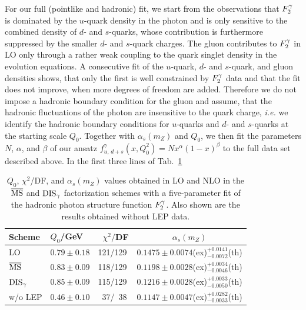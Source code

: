 \documentclass[aps,prl,twocolumn,groupedaddress]{revtex4}
\begin{document}
For our full (pointlike and hadronic) fit, we start from the observations that
$\f2y$ is dominated by the $u$-quark density in the photon and is only
sensitive to the combined density of $d$- and $s$-quarks, whose contribution is
furthermore suppressed by the smaller $d$- and $s$-quark charges. %
The gluon contributes to $\f2y$ in LO only through a rather weak coupling to
the quark singlet density in the evolution equations. A consecutive
fit of the $u$-quark, $d$- and $s$-quark, and gluon densities shows, that only
the first is well constrained by $\f2y$ data and that the fit does not
improve, when more degrees of freedom are added. Therefore we do not impose a
hadronic boundary condition for the gluon and assume, that the hadronic
fluctuations of the photon are insensitive to the quark charge, {\it i.e.} we
identify the hadronic boundary conditions for $u$-quarks and $d$- and
$s$-quarks at the starting scale $Q_0$. Together with $\alpha_s(m_Z)$ and
$Q_0$, we then fit the parameters $N$, $\alpha$, and $\beta$ of our ansatz
$f_{u,\,d+s}^\gamma (x,Q_0^2)=Nx^\alpha(1-x)^\beta$ to the
full data set described above. In the first three lines of Tab.\ \ref{tab:2}
%
\begin{table}
\caption{\label{tab:2}$Q_0$, $\chi^2$/DF,
         and $\alpha_s(m_Z)$ values obtained in LO and
         NLO in the $\overline{\rm MS}$ and ${\rm DIS}_\gamma$ factorization schemes with a
         five-parameter fit of
         the hadronic  photon structure function $\f2y$. Also shown are the 
         results obtained without LEP data.}
\begin{ruledtabular}
\begin{tabular}{lllc}
       Scheme & $Q_0$/GeV &~$\chi^2/$DF& $\alpha_s(m_Z)$ \\
\hline
       LO     & $0.79\pm0.18$&121/129& $0.1475\pm0.0074$(ex)$^{+0.0141}_{-0.0072}$(th)\\
       $\overline{\rm MS}$  & $0.83\pm0.09$&118/129& $0.1198\pm0.0028$(ex)$^{+0.0034}_{-0.0046}$(th)\\
       ${\rm DIS}_\gamma$& $0.85\pm0.09$&115/129& $0.1216\pm0.0028$(ex)$^{+0.0033}_{-0.0050}$(th)\\
\hline
       w/o LEP& $0.46\pm0.10$&~37/~38& $0.1147\pm0.0047$(ex)$^{+0.0282}_{-0.0033}$(th)\\
\end{tabular}
\end{ruledtabular}
\end{table}
\end{document}
